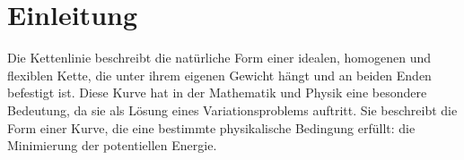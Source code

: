 %
%
%
%
\section{Einleitung\label{kettenlinie:section:Einleitung}}
Die Kettenlinie beschreibt die natürliche Form einer idealen, homogenen und flexiblen Kette, die unter ihrem eigenen Gewicht hängt und an beiden Enden befestigt ist.
Diese Kurve hat in der Mathematik und Physik eine besondere Bedeutung, da sie als Lösung eines Variationsproblems auftritt.
Sie beschreibt die Form einer Kurve, die eine bestimmte physikalische Bedingung erfüllt: die Minimierung der potentiellen Energie. 

